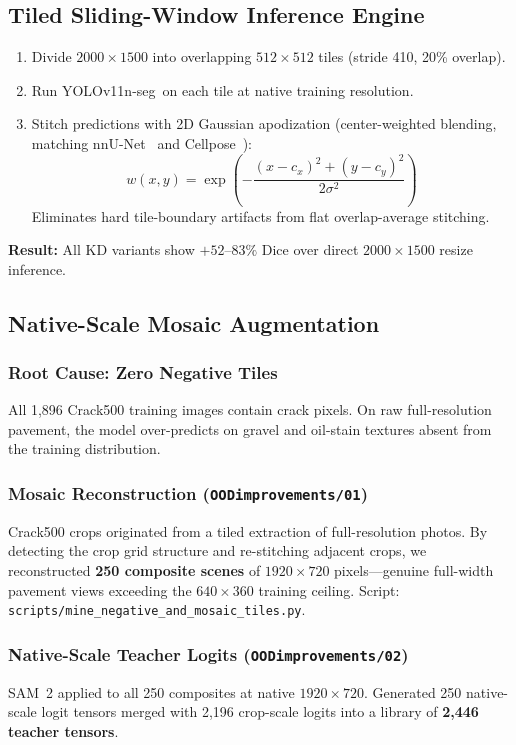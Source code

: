 \documentclass[12pt,a4paper]{article}
\newcommand{\yolo}{YOLOv11n-seg}
\begin{document}
\subsection{Tiled Sliding-Window Inference Engine}

\begin{enumerate}
  \item Divide $2000\times1500$ into overlapping $512\times512$ tiles
    (stride 410, 20\% overlap).
  \item Run \yolo\ on each tile at native training resolution.
  \item Stitch predictions with 2D Gaussian apodization (center-weighted
    blending, matching nnU-Net~\cite{isensee2021nnunet} and
    Cellpose~\cite{stringer2021cellpose}):
    \[w(x,y)=\exp\!\left(-\frac{(x-c_x)^2+(y-c_y)^2}{2\sigma^2}\right)\]
    Eliminates hard tile-boundary artifacts from flat overlap-average stitching.
\end{enumerate}

\textbf{Result:} All KD variants show $+52\text{--}83\%$ Dice over direct
$2000\times1500$ resize inference.

\subsection{Native-Scale Mosaic Augmentation}
\label{sec:mosaic}

\subsubsection{Root Cause: Zero Negative Tiles}
All 1,896 Crack500 training images contain crack pixels.
On raw full-resolution pavement, the model over-predicts on gravel and
oil-stain textures absent from the training distribution.

\subsubsection{Mosaic Reconstruction (\texttt{OODimprovements/01})}
Crack500 crops originated from a tiled extraction of full-resolution photos.
By detecting the crop grid structure and re-stitching adjacent crops, we
reconstructed \textbf{250 composite scenes} of $1920\times720$ pixels---genuine
full-width pavement views exceeding the $640\times360$ training ceiling.
Script: \texttt{scripts/mine\_negative\_and\_mosaic\_tiles.py}.

\subsubsection{Native-Scale Teacher Logits (\texttt{OODimprovements/02})}
SAM~2 applied to all 250 composites at native $1920\times720$.
Generated 250 native-scale logit tensors merged with 2,196 crop-scale logits
into a library of \textbf{2,446 teacher tensors}.
\end{document}

